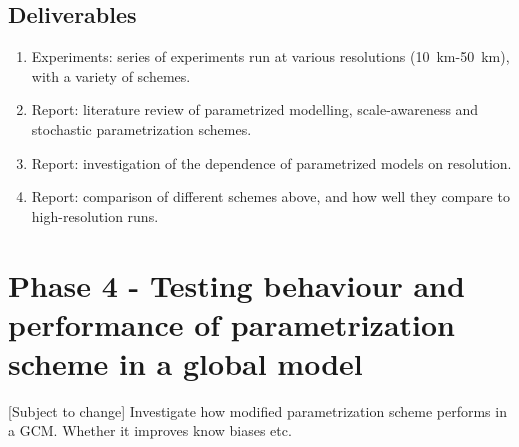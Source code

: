 \documentclass[11pt,a4paper]{article}
\begin{document}
\subsection*{Deliverables}
\begin{enumerate}
    \item Experiments: series of experiments run at various resolutions (\SI{10}{km}-\SI{50}{km}), with a variety of schemes.
    \item Report: literature review of parametrized modelling, scale-awareness and stochastic parametrization schemes.
    \item Report: investigation of the dependence of parametrized models on resolution.
    \item Report: comparison of different schemes above, and how well they compare to high-resolution runs.
\end{enumerate}

\section*{Phase 4 - Testing behaviour and performance of parametrization scheme in a global model}

[Subject to change] 
Investigate how modified parametrization scheme performs in a GCM. Whether it improves know biases etc. 
\end{document}
